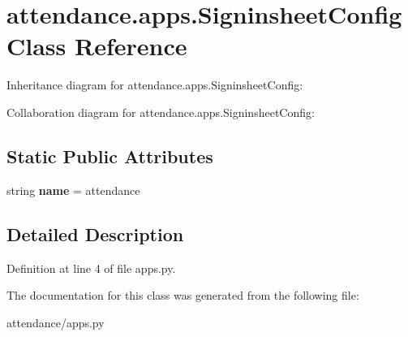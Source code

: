 \hypertarget{classattendance_1_1apps_1_1_signinsheet_config}{}\section{attendance.\+apps.\+Signinsheet\+Config Class Reference}
\label{classattendance_1_1apps_1_1_signinsheet_config}


Inheritance diagram for attendance.\+apps.\+Signinsheet\+Config\+:


Collaboration diagram for attendance.\+apps.\+Signinsheet\+Config\+:
\subsection*{Static Public Attributes}
\begin{DoxyCompactItemize}
\item 
\hypertarget{classattendance_1_1apps_1_1_signinsheet_config_ab05da596ea1957c6ab3f3facc3cc573d}{}\label{classattendance_1_1apps_1_1_signinsheet_config_ab05da596ea1957c6ab3f3facc3cc573d} 
string {\bfseries name} = \textquotesingle{}attendance\textquotesingle{}
\end{DoxyCompactItemize}


\subsection{Detailed Description}


Definition at line 4 of file apps.\+py.



The documentation for this class was generated from the following file\+:\begin{DoxyCompactItemize}
\item 
attendance/apps.\+py\end{DoxyCompactItemize}
